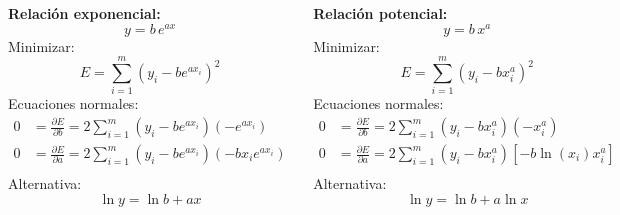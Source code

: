 \documentclass[9pt, aspectratio=169]{beamer}
\begin{document}
\begin{frame}
	\begin{columns}[t]
		\cx
		\textbf{Relación exponencial:}
		\[ y = b \, e^{a x} \]
		Minimizar:
		\[ E = \sum_{i=1}^m (y_i - b e^{a x_i})^2 \]
		Ecuaciones normales:
		\begin{align*}
			0 & = \frac{\partial E}{\partial b} = 2 \sum_{i=1}^m (y_i - b e^{a x_i})(-e^{a x_i})       \\
			0 & = \frac{\partial E}{\partial a} = 2 \sum_{i=1}^m (y_i - b e^{a x_i})(-b x_i e^{a x_i}) \\
		\end{align*}
		\alert{Alternativa:}
		\[ \ln y = \ln b + a x \]

		\cx
		\textbf{Relación potencial:}
		\[ y = b \, x^{a} \]
		Minimizar:
		\[ E = \sum_{i=1}^m (y_i - b x_i^a)^2 \]
		Ecuaciones normales:
		\begin{align*}
			0 & = \frac{\partial E}{\partial b} = 2 \sum_{i=1}^m (y_i - b x_i^{a})(-x_i^{a})            \\
			0 & = \frac{\partial E}{\partial a} = 2 \sum_{i=1}^m (y_i - b x_i^{a})[-b \ln(x_i) x_i^{a}] \\
		\end{align*}
		\alert{Alternativa:}
		\[ \ln y = \ln b + a \ln x \]
	\end{columns}
\end{frame}
\end{document}
